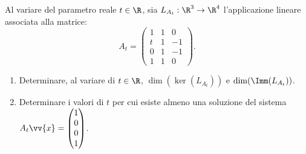 \begin{tcolorbox}[colback=white, colframe=navyblue, title={\textbf{Testo del Problema 2 — Matrice Parametrica $4 \times 3$ e Compatibilità}}]
Al variare del parametro reale $t \in \R$, sia $L_{A_t}: \R^3 \to \R^4$ l'applicazione lineare associata alla matrice:
\begin{equation}
    A_t = \begin{pmatrix}
        1 & 1 & 0 \\
        t & 1 & -1 \\
        0 & 1 & -1 \\
        1 & 1 & 0
    \end{pmatrix}.
\end{equation}
\begin{enumerate}[label=(\roman*)]
    \item Determinare, al variare di $t \in \R$, $\dim(\ker(L_{A_t}))$ e $\dim(\Imm(L_{A_t}))$.
    \item Determinare i valori di $t$ per cui esiste almeno una soluzione del sistema $A_t \vv{x} = \begin{pmatrix} 1 \\ 0 \\ 0 \\ 1 \end{pmatrix}$.
\end{enumerate}
\end{tcolorbox}

